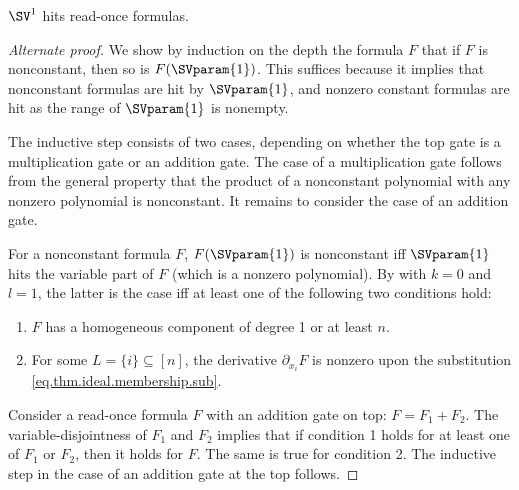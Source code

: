 \documentclass{toc}
\begin{document}
\begin{theorem}
    \label{thm.rof}
    $\SV^1$ hits read-once formulas.
\end{theorem}

\begin{proof}[Alternate proof]
We show by induction on the depth the formula $F$ that if $F$ is nonconstant, then so is $F(\SVparam{1})$. This suffices because it implies that nonconstant formulas are hit by $\SVparam{1}$, and nonzero constant formulas are hit as the range of $\SVparam{1}$ is nonempty.

The inductive step consists of two cases, depending on whether
the top gate is a multiplication gate or an addition gate. The case of a multiplication gate follows from the general property that the product of a nonconstant polynomial with any nonzero polynomial is nonconstant. It remains to consider the case of an addition gate.

For a nonconstant formula $F$, $F(\SVparam{1})$ is nonconstant iff $\SVparam{1}$ hits the variable part of $F$ (which is a nonzero polynomial). By  with $k=0$ and $l=1$, the latter is the case iff at least one of the following two conditions hold:
\begin{enumerate}
\item $F$ has a homogeneous component of degree 1 or at least $n$.
\item For some $L = \{i\} \subseteq [n]$, the derivative $\partial_{x_i} F$ is nonzero upon the substitution \eqref{eq.thm.ideal.membership.sub}.
\end{enumerate}
Consider a read-once formula $F$ with an addition gate on top: $F = F_1 + F_2$. The variable-disjointness of $F_1$ and $F_2$ implies that if condition 1 holds for at least one of $F_1$ or $F_2$, then it holds for $F$. The same is true for condition 2. The inductive step in the case of an addition gate at the top follows. 
\end{proof}
\end{document}
